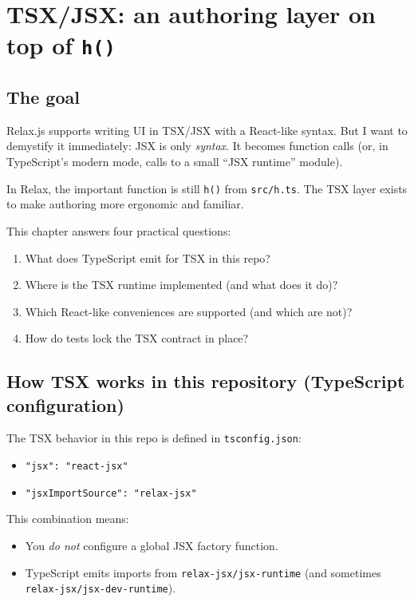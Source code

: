 \chapter{TSX/JSX: an authoring layer on top of \texttt{h()}}

\section{The goal}
Relax.js supports writing UI in TSX/JSX with a React-like syntax.
But I want to demystify it immediately: JSX is only \emph{syntax}.
It becomes function calls (or, in TypeScript's modern mode, calls to a small ``JSX runtime'' module).

In Relax, the important function is still \texttt{h()} from \texttt{src/h.ts}.
The TSX layer exists to make authoring more ergonomic and familiar.

This chapter answers four practical questions:

\begin{enumerate}
  \item What does TypeScript emit for TSX in this repo?
  \item Where is the TSX runtime implemented (and what does it do)?
  \item Which React-like conveniences are supported (and which are not)?
  \item How do tests lock the TSX contract in place?
\end{enumerate}

\section{How TSX works in this repository (TypeScript configuration)}
The TSX behavior in this repo is defined in \texttt{tsconfig.json}:

\begin{itemize}
  \item \texttt{"jsx": "react-jsx"}
  \item \texttt{"jsxImportSource": "relax-jsx"}
\end{itemize}

This combination means:

\begin{itemize}
  \item You \emph{do not} configure a global JSX factory function.
  \item TypeScript emits imports from \texttt{relax-jsx/jsx-runtime} (and sometimes \texttt{relax-jsx/jsx-dev-runtime}).
\end{itemize}

